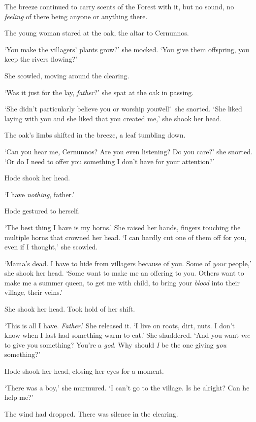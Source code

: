 The breeze continued to carry scents of the Forest with it, but no
sound, no \textit{feeling} of there being anyone or anything there.

The young woman stared at the oak, the altar to Cernunnos.

`You make the villagers' plants grow?' she mocked. `You give them
offspring, you keep the rivers flowing?'

She scowled, moving around the clearing.

`Was it just for the lay, \textit{father}?' she spat at the oak in
passing.

`She didn't particularly believe you or worship you\=well\='~she
snorted. `She liked laying with you and she liked that you created
me,' she shook her head.

The oak's limbs shifted in the breeze, a leaf tumbling down.

`Can you hear me, Cernunnos? Are you even listening? Do you care?' she
snorted. `Or do I need to offer you something I don't have for your
attention?'

Hode shook her head.

`I have \textit{nothing}, father.'

Hode gestured to herself.

`The best thing I have is my horns.' She raised her hands, fingers
touching the multiple horns that crowned her head. `I can hardly cut
one of them off for you, even if I thought,' she scowled.

`Mama's dead. I have to hide from villagers because of you. Some of
\textit{your} people,' she shook her head. `Some want to make me an
offering to you. Others want to make me a summer queen, to get me with
child, to bring your \textit{blood} into their village, their veins.'

She shook her head. Took hold of her shift.

`This is all I have. \textit{Father}.' She released it. `I live on
roots, dirt, nuts. I don't know when I last had something warm to
eat.' She shuddered. `And you want \textit{me} to give you something?
You're a \textit{god}. Why should \textit{I} be the one giving
\textit{you} something?'

Hode shook her head, closing her eyes for a moment.

`There was a boy,' she murmured. `I can't go to the village. Is he
alright? Can he help me?'

The wind had dropped. There was silence in the clearing.

